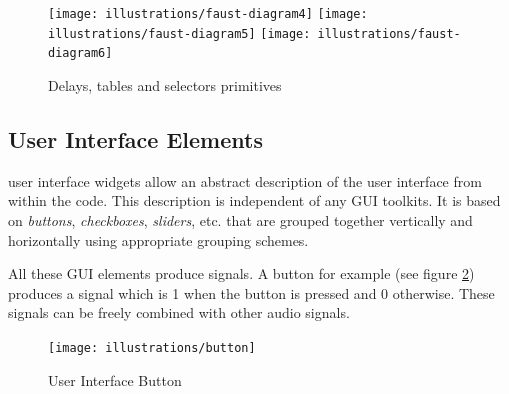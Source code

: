 \documentclass[a4paper,10pt]{book}
\begin{document}
\begin{figure}
\centering
\texttt{[image: illustrations/faust-diagram4]}
\texttt{[image: illustrations/faust-diagram5]}
\texttt{[image: illustrations/faust-diagram6]}
\caption{Delays, tables and selectors primitives }
\label{fig:delays}
\end{figure}


\subsection{User Interface Elements}


\faust user interface widgets allow an abstract description of the user interface from within the \faust code. This description is
independent of any GUI toolkits. It is based on \emph{buttons}, \emph{checkboxes}, \emph{sliders}, etc. that are grouped together 
vertically and horizontally using appropriate grouping schemes.

All these GUI elements produce signals. A button for example (see figure \ref{fig:button}) produces a signal which is 1 when the button is pressed and 0 otherwise. These signals can be freely combined with other audio signals. 

\begin{figure}[h]
\centering
\texttt{[image: illustrations/button]}
\caption{User Interface Button}
\label{fig:button}
\end{figure}


\bigskip
\end{document}
